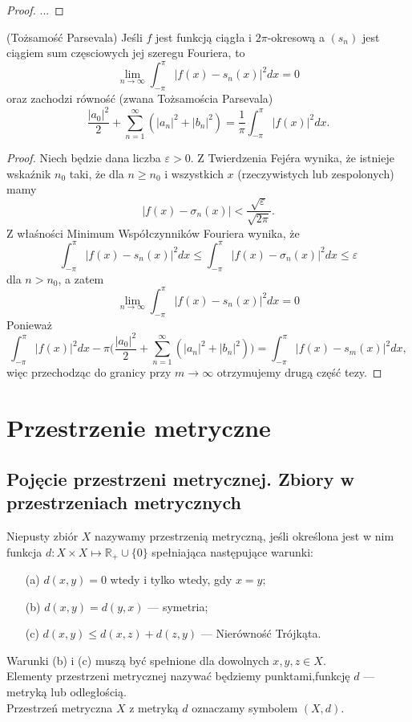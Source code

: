 \documentclass[leqno]{article}
\newcounter{defcounter}
\begin{document}
\begin{justify}
\begin{proof}
...
\end{proof}

\begin{theorem}
{
    (Tożsamość Parsevala)
    Jeśli $f$ jest funkcją ciągła i $2\pi$-okresową a $(s_n)$ jest ciągiem sum częsciowych jej szeregu Fouriera, to 
    \[
        \lim_{n \to \infty}\int_{-\pi}^{\pi}{|f(x) - s_n(x)|}^2dx = 0
    \]
    oraz zachodzi równość (zwana Tożsamościa Parsevala)
    \[
        \frac{|a_0|^2}{2} + \sum_{n=1}^{\infty}(|a_n|^2 + |b_n|^2) = \frac{1}{\pi}\int_{-\pi}^{\pi}{|f(x)|}^2dx.
    \]
}
\end{theorem}

\begin{proof}
    Niech będzie dana liczba $\varepsilon > 0$. Z Twierdzenia Fejéra wynika, że istnieje wskaźnik $n_0$ taki, 
    że dla $n \geqslant n_0$ i wszystkich $x$ (rzeczywistych lub zespolonych) mamy 
    \[
        |f(x) - \sigma_n(x)| < \frac{\sqrt{\varepsilon}}{\sqrt{2\pi}}.  
    \]
    Z właśności Minimum Współczynników Fouriera wynika, że 
    \[
        \int_{-\pi}^{\pi}{|f(x) - s_n(x)|}^2dx \leqslant \int_{-\pi}^{\pi}{|f(x) - \sigma_n(x)|}^2dx \leqslant \varepsilon
    \]
    dla $n > n_0$, a zatem 
    \[
        \lim_{n \to \infty} \int_{-\pi}^{\pi}{|f(x) - s_n(x)|}^2dx = 0
    \]
    Ponieważ 
    \[
        \int_{-\pi}^{\pi}|f(x)|^2 dx - \pi\Big(\frac{|a_0|^2}{2} + \sum_{n=1}^{\infty}(|a_n|^2 + |b_n|^2)\Big) = \int_{-\pi}^{\pi}{|f(x) - s_m(x)|}^2dx,
    \]
    więc przechodząc do granicy przy $m \to \infty$ otrzymujemy drugą część tezy.
\end{proof}

\newpage
\section{Przestrzenie metryczne}
\subsection{Pojęcie przestrzeni metrycznej. Zbiory w przestrzeniach metrycznych}

\setcounter{defcounter}{110}
\begin{defn}
Niepusty zbiór $X$ nazywamy przestrzenią metryczną, jeśli określona jest w nim funkcja $d : X \times X \mapsto \mathbb{R}_+ \cup \{0\}$ spełniająca
następujące warunki:
\begin{itemize}
    \item [(a)] $d(x, y) = 0$ wtedy i tylko wtedy, gdy $x = y$;
    \item [(b)] $d(x, y) = d(y, x)$ --- symetria;
    \item [(c)] $d(x, y) \leqslant d(x, z) + d(z, y)$ --- Nierówność Trójkąta.
\end{itemize}
Warunki (b) i (c) muszą być spełnione dla dowolnych $x, y, z \in X$. \\
Elementy przestrzeni metrycznej nazywać będziemy punktami,funkcję $d$ --- metryką lub odległością. \\
Przestrzeń metryczna $X$ z metryką $d$ oznaczamy symbolem $(X, d)$.
\end{defn}


\end{justify}
\end{document}
